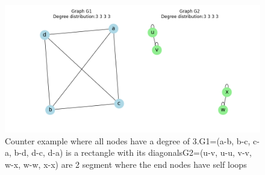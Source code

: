 \documentclass[a4paper]{article}
\begin{document}
\begin{figure}[ht]
    \centering
    \includegraphics[width=.6\textwidth]{figures/graph_compare_quad.png}
    \caption{Counter example where all nodes have a degree of 3.G1=(a-b, b-c, c-a, b-d, d-c, d-a) is a rectangle with its diagonalsG2=(u-v, u-u, v-v, w-x, w-w, x-x) are 2 segment where the end nodes have self loops}
    \label{fig:graph_compare_quad}
\end{figure}





\end{document}
